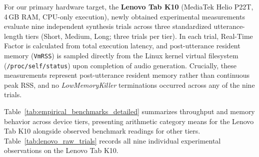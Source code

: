 For our primary hardware target, the \textbf{Lenovo Tab K10} (MediaTek Helio P22T, 4\,GB RAM, CPU-only execution), newly obtained experimental measurements evaluate nine independent synthesis trials across three standardized utterance-length tiers (Short, Medium, Long; three trials per tier). In each trial, Real-Time Factor is calculated from total execution latency, and post-utterance resident memory (\texttt{VmRSS}) is sampled directly from the Linux kernel virtual filesystem (\texttt{/proc/self/status}) upon completion of audio generation. Crucially, these measurements represent post-utterance resident memory rather than continuous peak RSS, and no \textit{LowMemoryKiller} terminations occurred across any of the nine trials.

Table~\ref{tab:empirical_benchmarks_detailed} summarizes throughput and memory behavior across device tiers, presenting arithmetic category means for the Lenovo Tab K10 alongside observed benchmark readings for other tiers. Table~\ref{tab:lenovo_raw_trials} records all nine individual experimental observations on the Lenovo Tab K10.

